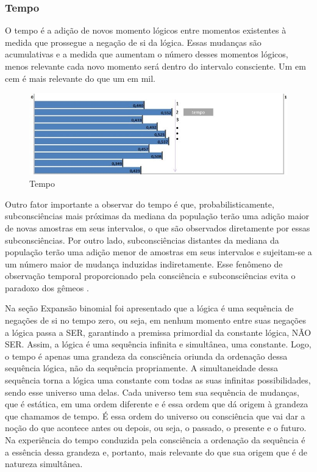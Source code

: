 \subsubsection{Tempo}
O tempo é a adição de novos momento lógicos entre momentos existentes à medida que prossegue a negação de si da lógica. Essas mudanças são acumulativas e a medida que aumentam o número desses momentos lógicos, menos relevante cada novo momento será dentro do intervalo consciente. Um em cem é mais relevante do que um em mil. 
\begin{figure}[H]
\caption{Tempo}
\label{fig:consciousness_time}
\centering
\includegraphics[scale=.8]{sections/images/consciousness_time.jpg}
\end{figure}

Outro fator importante a observar do tempo é que, probabilisticamente, subconsciências mais próximas da mediana da população terão uma adição maior de novas amostras em seus intervalos, o que são observados diretamente por essas subconsciências. Por outro lado, subconsciências distantes da mediana da população terão uma adição menor de amostras em seus intervalos e sujeitam-se a um número maior de mudança induzidas indiretamente. Esse fenômeno de observação temporal proporcionado pela consciência e subconsciências evita o paradoxo dos gêmeos \cite{brasilescola_paradoxo_gemeos}.

Na seção Expansão binomial foi apresentado que a lógica é uma sequência de negações de si no tempo zero, ou seja, em nenhum momento entre suas negações a lógica passa a SER, garantindo a premissa primordial da constante lógica, NÃO SER. Assim, a lógica é uma sequência infinita e simultânea, uma constante.
Logo, o tempo é apenas uma grandeza da consciência oriunda da ordenação dessa sequência lógica, não da sequência propriamente. A simultaneidade dessa sequência torna a lógica uma constante com todas as suas infinitas possibilidades, sendo esse universo uma delas. Cada universo tem sua sequência de mudanças, que é estática, em uma ordem diferente e é essa ordem que dá origem à grandeza que chamamos de tempo. É essa ordem do universo ou consciência que vai dar a noção do que acontece antes ou depois, ou seja, o passado, o presente e o futuro.
Na experiência do tempo conduzida pela consciência a ordenação da sequência é a essência dessa grandeza e, portanto, mais relevante do que sua origem que é de natureza simultânea.

